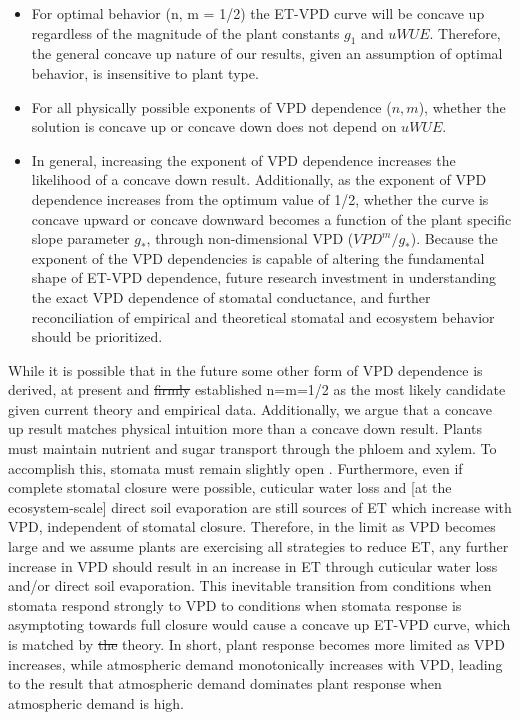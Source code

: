 \documentclass[hess, manuscript]{copernicus}
\providecommand{\DIFaddtex}[1]{{\protect\color{blue}\uwave{#1}}} %
\providecommand{\DIFdeltex}[1]{{\protect\color{red}\sout{#1}}}                      %
\providecommand{\DIFaddbegin}{} %
\providecommand{\DIFaddend}{} %
\providecommand{\DIFdelbegin}{} %
\providecommand{\DIFdelend}{} %
\providecommand{\DIFadd}[1]{\texorpdfstring{\DIFaddtex{#1}}{#1}} %
\providecommand{\DIFdel}[1]{\texorpdfstring{\DIFdeltex{#1}}{}} %
\begin{document}
 \begin{itemize}
  \item For optimal behavior (n, m = 1/2) the ET-VPD curve will be
    concave up regardless of the magnitude of the plant constants
    $g_1$ and \DIFdelbegin \DIFdel{$uWUE$}\DIFdelend \DIFaddbegin \DIFadd{uWUE}\DIFaddend . Therefore, the general concave up nature of our
    results, given an assumption of optimal behavior, is insensitive
    to plant type.
  \item For all physically possible exponents of VPD dependence ($n,
    m$), whether the solution is concave up or concave down does not
    depend on \DIFdelbegin \DIFdel{$uWUE$}\DIFdelend \DIFaddbegin \DIFadd{uWUE}\DIFaddend .
  \item In general, increasing the exponent of VPD dependence \DIFaddbegin \DIFadd{for
    either $uWUE*$ or $g_*$ }\DIFaddend increases the likelihood of a concave down
    result. Additionally, as the exponent of VPD dependence increases
    from the optimum value of 1/2, whether the curve is concave upward
    or concave downward becomes a function of the plant specific slope
    parameter $g_*$, through non-dimensional VPD
    ($VPD^m/g_*$). Because the exponent of the VPD dependencies is
    capable of altering the fundamental shape of ET-VPD dependence,
    future research investment in understanding the exact VPD
    dependence of stomatal conductance, and further reconciliation of
    empirical and theoretical stomatal and ecosystem behavior should
    be prioritized.
 \end{itemize}
\DIFaddbegin

\DIFaddend While it is possible that in the future some other form of VPD
dependence is derived, at present \cite{MEDLYN_2011} and
\cite{Zhou_2014} \DIFdelbegin \DIFdel{firmly }\DIFdelend established n=m=1/2 as the most likely candidate
given current theory and empirical data. Additionally, we argue that a
concave up result matches physical intuition more than a concave down
result. Plants must maintain nutrient and sugar transport through the
phloem and xylem. To accomplish this, stomata must remain slightly
open \citep{De_2013, Nikinmaa_2013, Ryan_2014}. Furthermore, even if
complete stomatal closure were possible, cuticular water loss and [at
the ecosystem-scale] direct soil evaporation are still sources of ET
which increase with VPD, independent of stomatal closure. Therefore,
in the limit as VPD becomes large and we assume plants are exercising
all strategies to reduce ET, any further increase in VPD should result
in an increase in ET through cuticular water loss and/or direct soil
evaporation. This inevitable transition from conditions when stomata
respond strongly to VPD to conditions when stomata response is
asymptoting towards full closure would cause a concave up ET-VPD
curve, which is matched by \DIFdelbegin \DIFdel{the }\DIFdelend \DIFaddbegin \DIFadd{our }\DIFaddend theory. In short, plant response
becomes more limited as VPD increases, while atmospheric demand
monotonically increases with VPD, leading to the result that
atmospheric demand dominates plant response when atmospheric demand is
high.
\end{document}
